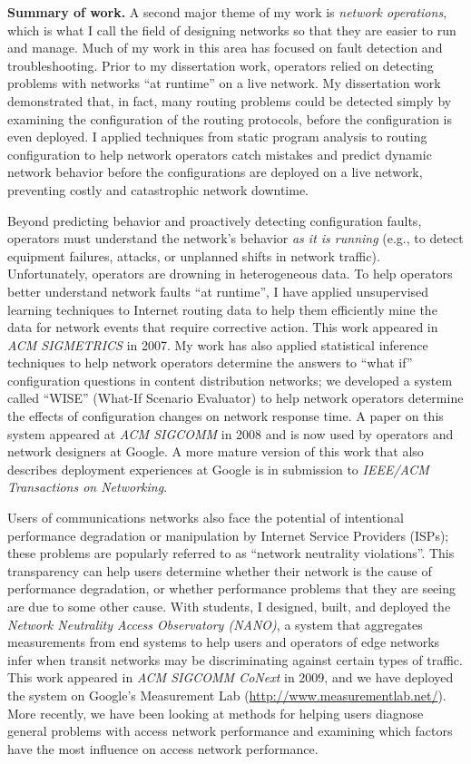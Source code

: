 {\bf Summary of work.}  A second major theme of my work is {\em network
operations}, which is what I call the field of designing networks so
that they are easier to run and manage.  Much of my work in this area
has focused on fault detection and troubleshooting.  Prior to my
dissertation work, operators relied on detecting problems with networks
``at runtime'' on a live network.  My dissertation work demonstrated
that, in fact, many routing problems could be detected simply by
examining the configuration of the routing protocols, before the
configuration is even deployed.  I applied techniques from static
program analysis to routing configuration to help network operators
catch mistakes and predict dynamic network behavior before the
configurations are deployed on a live network, preventing costly and
catastrophic network downtime.

Beyond predicting behavior and proactively detecting configuration
faults, operators must understand the network's behavior {\em as it is
running} (e.g., to detect equipment failures, attacks, or unplanned
shifts in network traffic).  Unfortunately, operators are drowning in
heterogeneous data.  To help operators better understand network faults
``at runtime'', I have applied unsupervised learning techniques to
Internet routing data to help them efficiently mine the data for network
events that require corrective action.  This work appeared in {\em ACM
SIGMETRICS} in 2007.  My work has also applied statistical inference
techniques to help network operators determine the answers to ``what
if'' configuration questions in content distribution networks; we
developed a system called ``WISE'' (What-If Scenario Evaluator) to help
network operators determine the effects of configuration changes on
network response time.  A paper on this system appeared at {\em ACM
SIGCOMM} in 2008 and is now used by operators and network designers at
Google.  A more mature version of this work that also describes
deployment experiences at Google is in submission to {\em IEEE/ACM
Transactions on Networking}.

Users of communications networks also face the potential of intentional
performance degradation or manipulation by Internet Service Providers
(ISPs); these problems are popularly referred to as ``network neutrality
violations''.  This transparency can help users determine whether their
network is the cause of performance degradation, or whether performance
problems that they are seeing are due to some other cause.  With
students, I designed, built, and deployed the {\em Network Neutrality
Access Observatory (NANO)}, a system that aggregates measurements from
end systems to help users and operators of edge networks infer when
transit networks may be discriminating against certain types of traffic.
This work appeared in {\em ACM SIGCOMM CoNext} in 2009, and we have
deployed the system on Google's Measurement Lab
(\url{http://www.measurementlab.net/}).  More recently, we have been
looking at methods for helping users diagnose general problems with
access network performance and examining which factors have the most
influence on access network performance.

